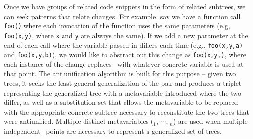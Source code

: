 Once we have groups of related code snippets in the form of related subtrees,
we can seek patterns that relate changes.  For example, say we have a function
call {\tt foo()} where each invocation of the function uses the same
parameters (e.g, {\tt foo(x,y)}, where {\tt x} and {\tt y} are always the
same). If we add a new parameter at the end of each call where the variable
passed in differs each time (e.g., {\tt foo(x,y,a)} and {\tt foo(x,y,b)}), we
would like to abstract out this change as {\tt foo(x,y,\metavar)}, where each
instance of the change replaces \metavar~with whatever concrete variable is
used at that point. The antiunification algorithm is built for this purpose --
given two trees, it seeks the least-general generalization of the pair and
produces a triplet representing the generalized tree with a metavariable
introduced where the two differ, as well as a substitution set that allows the
metavariable to be replaced with the appropriate concrete subtree necessary to
reconstitute the two trees that were antiunified.  Multiple distinct
metavariables (\metavar$_1$, $\cdots$, \metavar$_n$) are used when multiple
independent \metavar~points are necessary to represent a generalized set of
trees.
